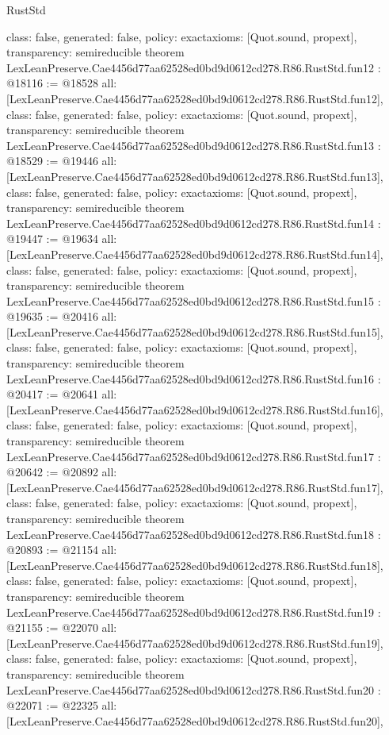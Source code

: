 \begin{lexlean}{RustStd}
\begin{coremodule}
{  class: false,
  generated: false,
  policy: exact{axioms: [Quot.sound, propext]},
  transparency: semireducible
}
theorem LexLeanPreserve.Cae4456d77aa62528ed0bd9d0612cd278.R86.RustStd.fun12 : @18116 := @18528 {
  all: [LexLeanPreserve.Cae4456d77aa62528ed0bd9d0612cd278.R86.RustStd.fun12],
  class: false,
  generated: false,
  policy: exact{axioms: [Quot.sound, propext]},
  transparency: semireducible
}
theorem LexLeanPreserve.Cae4456d77aa62528ed0bd9d0612cd278.R86.RustStd.fun13 : @18529 := @19446 {
  all: [LexLeanPreserve.Cae4456d77aa62528ed0bd9d0612cd278.R86.RustStd.fun13],
  class: false,
  generated: false,
  policy: exact{axioms: [Quot.sound, propext]},
  transparency: semireducible
}
theorem LexLeanPreserve.Cae4456d77aa62528ed0bd9d0612cd278.R86.RustStd.fun14 : @19447 := @19634 {
  all: [LexLeanPreserve.Cae4456d77aa62528ed0bd9d0612cd278.R86.RustStd.fun14],
  class: false,
  generated: false,
  policy: exact{axioms: [Quot.sound, propext]},
  transparency: semireducible
}
theorem LexLeanPreserve.Cae4456d77aa62528ed0bd9d0612cd278.R86.RustStd.fun15 : @19635 := @20416 {
  all: [LexLeanPreserve.Cae4456d77aa62528ed0bd9d0612cd278.R86.RustStd.fun15],
  class: false,
  generated: false,
  policy: exact{axioms: [Quot.sound, propext]},
  transparency: semireducible
}
theorem LexLeanPreserve.Cae4456d77aa62528ed0bd9d0612cd278.R86.RustStd.fun16 : @20417 := @20641 {
  all: [LexLeanPreserve.Cae4456d77aa62528ed0bd9d0612cd278.R86.RustStd.fun16],
  class: false,
  generated: false,
  policy: exact{axioms: [Quot.sound, propext]},
  transparency: semireducible
}
theorem LexLeanPreserve.Cae4456d77aa62528ed0bd9d0612cd278.R86.RustStd.fun17 : @20642 := @20892 {
  all: [LexLeanPreserve.Cae4456d77aa62528ed0bd9d0612cd278.R86.RustStd.fun17],
  class: false,
  generated: false,
  policy: exact{axioms: [Quot.sound, propext]},
  transparency: semireducible
}
theorem LexLeanPreserve.Cae4456d77aa62528ed0bd9d0612cd278.R86.RustStd.fun18 : @20893 := @21154 {
  all: [LexLeanPreserve.Cae4456d77aa62528ed0bd9d0612cd278.R86.RustStd.fun18],
  class: false,
  generated: false,
  policy: exact{axioms: [Quot.sound, propext]},
  transparency: semireducible
}
theorem LexLeanPreserve.Cae4456d77aa62528ed0bd9d0612cd278.R86.RustStd.fun19 : @21155 := @22070 {
  all: [LexLeanPreserve.Cae4456d77aa62528ed0bd9d0612cd278.R86.RustStd.fun19],
  class: false,
  generated: false,
  policy: exact{axioms: [Quot.sound, propext]},
  transparency: semireducible
}
theorem LexLeanPreserve.Cae4456d77aa62528ed0bd9d0612cd278.R86.RustStd.fun20 : @22071 := @22325 {
  all: [LexLeanPreserve.Cae4456d77aa62528ed0bd9d0612cd278.R86.RustStd.fun20],
}
\end{coremodule}
\end{lexlean}
